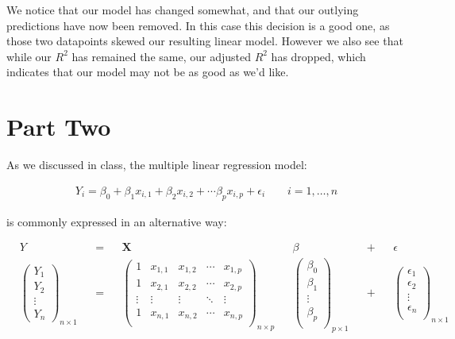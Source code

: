 \documentclass{article}
\begin{document}
    We notice that our model has changed somewhat, and that our outlying
predictions have now been removed. In this case this decision is a good
one, as those two datapoints skewed our resulting linear model. However
we also see that while our $R^2$ has remained the same, our adjusted
$R^2$ has dropped, which indicates that our model may not be as good as
we'd like.


    \section{Part Two}


    As we discussed in class, the multiple linear regression model:

\begin{equation*}
    \begin{aligned}
        Y_i = \beta_0 + \beta_1 x_{i,1} + \beta_2 x_{i,2} + \cdots \beta_p x_{i,p} + \epsilon_i \qquad i = 1, \ldots, n
    \end{aligned}
\end{equation*}

is commonly expressed in an alternative way:

\begin{equation}
    \begin{aligned}
        &Y& &=& &\mathbf{X}& &\beta& &+& &\epsilon&\\
        &\begin{pmatrix}
            Y_1\\
            Y_2\\
            \vdots\\
            Y_n
        \end{pmatrix}_{n \times 1}&
        &=&
        &\begin{pmatrix}
            1 & x_{1,1} & x_{1,2} & \cdots & x_{1,p}\\
            1 & x_{2,1} & x_{2,2} & \cdots & x_{2,p}\\
            \vdots & \vdots & \vdots & \ddots & \vdots\\
            1 & x_{n,1} & x_{n,2} & \cdots & x_{n,p}\\
        \end{pmatrix}_{n \times p}&
        &\begin{pmatrix}
            \beta_0\\
            \beta_1\\
            \vdots\\
            \beta_p\\
        \end{pmatrix}_{p \times 1}&
        &+&
        &\begin{pmatrix}
            \epsilon_1\\
            \epsilon_2\\
            \vdots\\
            \epsilon_n\\
        \end{pmatrix}_{n \times 1}&
    \end{aligned}
\end{equation}
\end{document}
